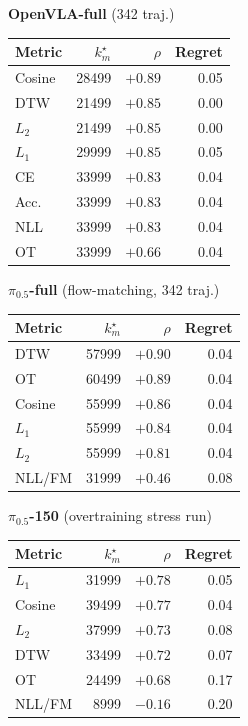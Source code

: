 \documentclass[11pt]{article}
\numberwithin{equation}{section}
\numberwithin{table}{section}
\numberwithin{figure}{section}
\begin{document}
\begin{table}[h]
\begin{minipage}[t]{0.48\textwidth}
\centering \textbf{OpenVLA-full} (342 traj.)\\[2pt]
\begin{tabular}{lrrr}
\toprule
Metric & $k_m^\star$ & $\rho$ & Regret \\ \midrule
Cosine & 28499 & $+0.89$ & 0.05 \\
DTW    & 21499 & $+0.85$ & 0.00 \\
$L_2$  & 21499 & $+0.85$ & 0.00 \\
$L_1$  & 29999 & $+0.85$ & 0.05 \\
CE     & 33999 & $+0.83$ & 0.04 \\
Acc.   & 33999 & $+0.83$ & 0.04 \\
NLL    & 33999 & $+0.83$ & 0.04 \\
OT     & 33999 & $+0.66$ & 0.04 \\
\bottomrule
\end{tabular}
\end{minipage}
\hfill
\begin{minipage}[t]{0.48\textwidth}
\centering \textbf{$\pi_{0.5}$-full} (flow-matching, 342 traj.)\\[2pt]
\begin{tabular}{lrrr}
\toprule
Metric & $k_m^\star$ & $\rho$ & Regret \\ \midrule
DTW    & 57999 & $+0.90$ & 0.04 \\
OT     & 60499 & $+0.89$ & 0.04 \\
Cosine & 55999 & $+0.86$ & 0.04 \\
$L_1$  & 55999 & $+0.84$ & 0.04 \\
$L_2$  & 55999 & $+0.81$ & 0.04 \\
NLL/FM & 31999 & $+0.46$ & 0.08 \\
\bottomrule
\end{tabular}
\end{minipage}

\vspace{1em}
\centering
\begin{minipage}[t]{0.48\textwidth}
\centering \textbf{$\pi_{0.5}$-150} (overtraining stress run)\\[2pt]
\begin{tabular}{lrrr}
\toprule
Metric & $k_m^\star$ & $\rho$ & Regret \\ \midrule
$L_1$  & 31999 & $+0.78$ & 0.05 \\
Cosine & 39499 & $+0.77$ & 0.04 \\
$L_2$  & 37999 & $+0.73$ & 0.08 \\
DTW    & 33499 & $+0.72$ & 0.07 \\
OT     & 24499 & $+0.68$ & 0.17 \\
NLL/FM &  8999 & $-0.16$ & 0.20 \\
\bottomrule
\end{tabular}
\end{minipage}
\end{table}
\end{document}
